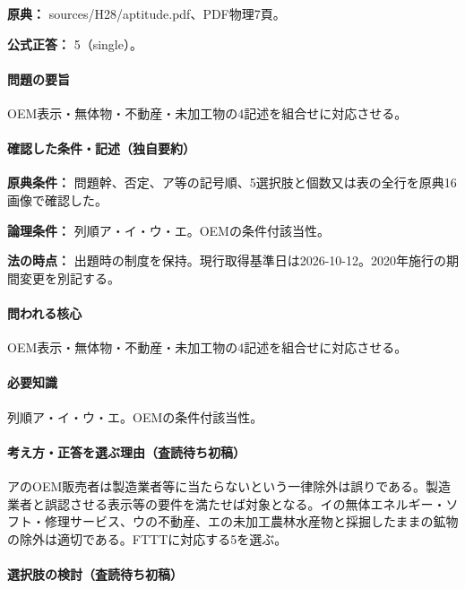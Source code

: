 \noindent\textbf{原典：} sources/H28/aptitude.pdf、PDF物理7頁。

\textbf{公式正答：} 5（single）。

\paragraph{問題の要旨} OEM表示・無体物・不動産・未加工物の4記述を組合せに対応させる。

\paragraph{確認した条件・記述（独自要約）}\mbox{}\par

\noindent\textbf{原典条件：} 問題幹、否定、ア等の記号順、5選択肢と個数又は表の全行を原典16画像で確認した。\par

\noindent\textbf{論理条件：} 列順ア・イ・ウ・エ。OEMの条件付該当性。\par

\noindent\textbf{法の時点：} 出題時の制度を保持。現行取得基準日は2026-10-12。2020年施行の期間変更を別記する。\par

\paragraph{問われる核心} OEM表示・無体物・不動産・未加工物の4記述を組合せに対応させる。

\paragraph{必要知識} 列順ア・イ・ウ・エ。OEMの条件付該当性。

\paragraph{考え方・正答を選ぶ理由（査読待ち初稿）} アのOEM販売者は製造業者等に当たらないという一律除外は誤りである。製造業者と誤認させる表示等の要件を満たせば対象となる。イの無体エネルギー・ソフト・修理サービス、ウの不動産、エの未加工農林水産物と採掘したままの鉱物の除外は適切である。FTTTに対応する5を選ぶ。

\paragraph{選択肢の検討（査読待ち初稿）}\mbox{}\par

